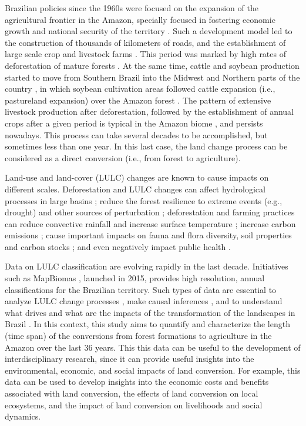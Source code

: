 \documentclass[essd, manuscript]{copernicus}
\begin{document}


\introduction[Introduction]

Brazilian policies since the 1960s were focused on the expansion of the agricultural frontier in the Amazon, specially focused in fostering economic growth and national security of the territory \citep{Carvalho2002, Mcdonald2003, Banerjee2009}. Such a development model led to the construction of thousands of kilometers of roads, and the establishment of large scale crop and livestock farms \citep{Carvalho2002, Banerjee2009}. This period was marked by high rates of deforestation of mature forests \citep{Fearnside2005}. At the same time, cattle and soybean production started to move from Southern Brazil into the Midwest and Northern parts of the country \citep{Silva2020a}, in which soybean cultivation areas followed cattle expansion (i.e., pastureland expansion) over the Amazon forest \citep{Simon2005, Barona2010, Arima2011}.
The pattern of extensive livestock production after deforestation, followed by the establishment of annual crops after a given period is typical in the Amazon biome \citep{Barona2010}, and persists nowadays.
This process can take several decades to be accomplished, but sometimes less than one year.
In this last case, the land change process can be considered as a direct conversion \citep{Morton2006} (i.e., from forest to agriculture).

Land-use and land-cover (LULC) changes are known to cause impacts on different scales.
Deforestation and LULC changes can affect hydrological processes in large basins \citep{Arias2018}; reduce the forest resilience to extreme events (e.g., drought) and other sources of perturbation \citep{Boulton2022}; deforestation and farming practices can reduce convective rainfall and increase surface temperature \citep{Maeda2021}; increase carbon emissions \citep{Gatti2021}; cause important impacts on fauna and flora diversity, soil properties and carbon stocks \citep{Nunes2022, Rittl2017}; and even negatively impact public health \citep{Ellwanger2020}.

Data on LULC classification are evolving rapidly in the last decade.
Initiatives such as MapBiomas \citep{Souza2020}, launched in 2015, provides high resolution, annual classifications for the Brazilian territory. Such types of data are essential to analyze LULC change processes \citep{Silva2020b}, make causal inferences \citep{Capmourteres2018, Gelo2022, Odongo2014, Larned2020}, and to understand what drives and what are the impacts of the transformation of the landscapes in Brazil \citep{Nunes2022}.
In this context, this study aims to quantify and characterize the length (time span) of the conversions from forest formations to agriculture in the Amazon over the last 36 years.
This this data can be useful to the development of interdisciplinary research, since it can provide useful insights into the environmental, economic, and social impacts of land conversion.
For example, this data can be used to develop insights into the economic costs and benefits associated with land conversion, the effects of land conversion on local ecosystems, and the impact of land conversion on livelihoods and social dynamics.
\end{document}

